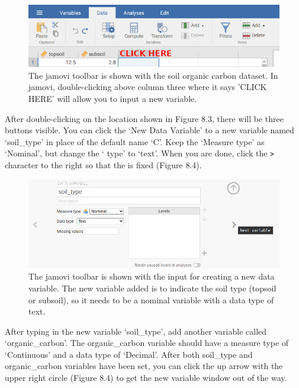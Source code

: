 \documentclass[
  openany]{krantz}
\begin{document}
\begin{figure}
\includegraphics[width=1\linewidth]{img/jamovi_new_variable} \caption{The jamovi toolbar is shown with the soil organic carbon dataset. In jamovi, double-clicking above column three where it says 'CLICK HERE' will allow you to input a new variable.}\label{fig:unnamed-chunk-27}
\end{figure}

After double-clicking on the location shown in Figure 8.3, there will be three buttons visible.
You can click the `New Data Variable' to  a new variable named `soil\_type' in place of the default name `C'.
Keep the `Measure type' as `Nominal', but change the ` type' to `text'.
When you are done, click the \texttt{\textgreater{}} character to the right so that the  is fixed (Figure 8.4).

\begin{figure}
\includegraphics[width=1\linewidth]{img/jamovi_set_variable} \caption{The jamovi toolbar is shown with the input for creating a new data variable. The new variable added is to indicate the soil type (topsoil or subsoil), so it needs to be a nominal variable with a data type of text.}\label{fig:unnamed-chunk-28}
\end{figure}

After typing in the new variable `soil\_type', add another variable called `organic\_carbon'.
The organic\_carbon variable should have a measure type of `Continuous' and a data type of `Decimal'.
After both soil\_type and organic\_carbon variables have been set, you can click the up arrow with the upper right circle (Figure 8.4) to get the new variable window out of the way.
\end{document}
